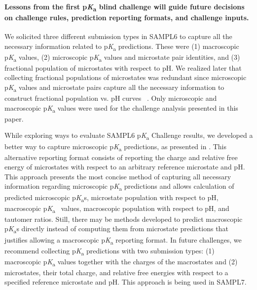\documentclass[9pt,lineno,final]{elife}
\newcommand{\pKa}{p\textit{K}\textsubscript{a}}
\begin{document}
\paragraph{Lessons from the first \pKa{} blind challenge will guide future decisions on challenge rules, prediction reporting formats, and challenge inputs.}
We solicited three different submission types in SAMPL6 to capture all the necessary information related to \pKa{} predictions. 
These were (1) macroscopic \pKa{} values, (2) microscopic \pKa{} values and microstate pair identities, and (3) fractional population of microstates with respect to pH. 
We realized later that collecting fractional populations of microstates was redundant since microscopic \pKa{} values and microstate pairs capture all the necessary information to construct fractional population vs. pH curves ~\citep{Gunner:2020:J.Comput.AidedMol.Des.}.  
Only microscopic and macroscopic \pKa{} values were used for the challenge analysis presented in this paper.

While exploring ways to evaluate SAMPL6 \pKa{} Challenge results, we developed a better way to capture microscopic \pKa{} predictions, as presented in \citet{Gunner:2020:J.Comput.AidedMol.Des.}. 
This alternative reporting format consists of reporting the charge and relative free energy of microstates with respect to an arbitrary reference microstate and pH.
This approach presents the most concise method of capturing all necessary information regarding microscopic \pKa{} predictions and allows calculation of predicted microscopic \pKa{}s, microstate population with respect to pH, macroscopic \pKa{}~ values, macroscopic population with respect to pH, and tautomer ratios. 
Still, there may be methods developed to predict macroscopic \pKa{}s directly instead of computing them from microstate predictions that justifies allowing a macroscopic \pKa{} reporting format. 
In future challenges, we recommend collecting \pKa{} predictions with two submission types: (1) macroscopic \pKa{} values together with the charges of the macrostates and (2) microstates, their total charge, and relative free energies with respect to a specified reference microstate and pH. 
This approach is being used in SAMPL7.
\end{document}
